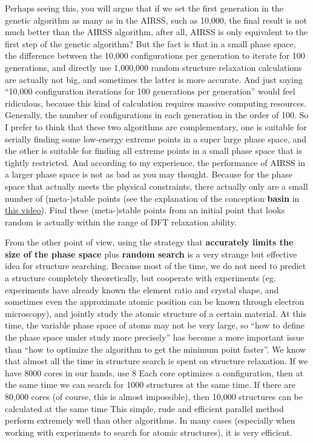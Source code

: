 \documentclass[a4paper, 10pt]{article}
\begin{document}
Perhaps seeing this, you will argue that if we set the first generation in the genetic algorithm as many as in the AIRSS, such as 10,000, the final result is not much better than the AIRSS algorithm, after all, AIRSS is only equivalent to the first step of the genetic algorithm? But the fact is that in a small phase space, the difference between the 10,000 configurations per generation to iterate for 100 generations, and directly use 1,000,000 random structure relaxation calculations are actually not big, and sometimes the latter is more accurate. And just saying ``10,000 configuration iterations for 100 generations per generation'' would feel ridiculous, because this kind of calculation requires massive computing resources. Generally, the number of configurations in each generation in the order of 100. So I prefer to think that these two algorithms are complementary, one is suitable for serially finding some low-energy extreme points in a super large phase space, and the other is suitable for finding all extreme points in a small phase space that is tightly restricted. And according to my experience, the performance of AIRSS in a larger phase space is not as bad as you may thought. Because for the phase space that actually meets the physical constraints, there actually only are a small number of (meta-)stable points (see the explanation of the conception \textbf{basin} in \href{https://www.youtube.com/watch?v=xW6pOYEIKVs&t=1061s}{this video}). Find these (meta-)stable points from an initial point that looks random is actually within the range of DFT relaxation ability.

From the other point of view, using the strategy that \textbf{accurately limits the size of the phase space} plus \textbf{random search} is a very strange but effective idea for structure searching. Because most of the time, we do not need to predict a structure completely theoretically, but cooperate with experiments (eg. experiments have already known the element ratio and crystal shape, and sometimes even the approximate atomic position can be known through electron microscopy), and jointly study the atomic structure of a certain material. At this time, the variable phase space of atoms may not be very large, so ``how to define the phase space under study more precisely'' has become a more important issue than ``how to optimize the algorithm to get the minimum point faster''. We know that almost all the time in structure search is spent on structure relaxation. If we have 8000 cores in our hands, use 8 Each core optimizes a configuration, then at the same time we can search for 1000 structures at the same time. If there are 80,000 cores (of course, this is almost impossible), then 10,000 structures can be calculated at the same time This simple, rude and efficient parallel method perform extremely well than other algorithms. In many cases (especially when working with experiments to search for atomic structures), it is very efficient.
\end{document}
